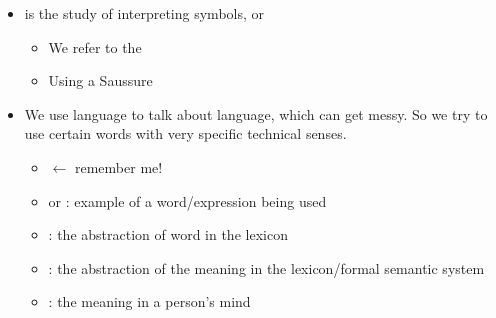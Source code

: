 \documentclass[a4paper,landscape,headrule,footrule,xetex]{foils}
\begin{document}
\begin{itemize}
\item {} is the study of interpreting symbols, or 
  \begin{itemize}
  \item We refer to the 
  \item Using a \hfill Saussure
  \end{itemize}

\item We use language to talk about language, which can get messy.  So we
try to use certain words with very specific technical senses.

\begin{itemize}
\item {} $\leftarrow$ remember me!
\item {} or : example of a word/expression being used
\item {}: the abstraction of word in the lexicon
\item {}: the abstraction of the meaning in the lexicon/formal semantic system
\item {}: the meaning in a person's mind
\end{itemize}
\end{itemize}

\end{document}
